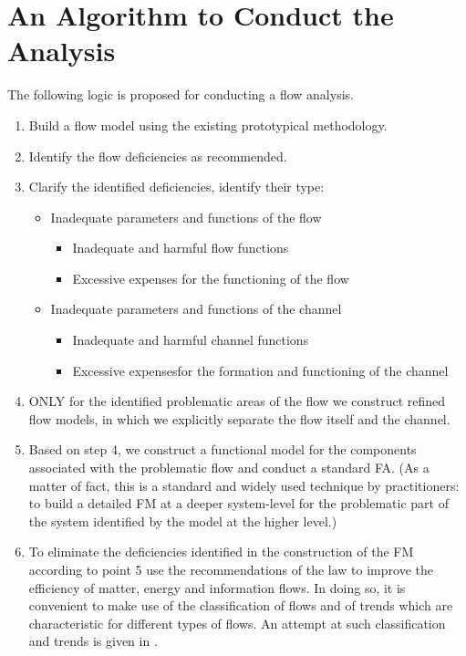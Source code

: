 \documentclass[a4paper,11pt]{article}
\begin{document}
\section*{An Algorithm to Conduct the Analysis}
The following logic is proposed for conducting a flow analysis.
\begin{enumerate}
\item Build a flow model using the existing prototypical methodology.
\item Identify the flow deficiencies as recommended.
\item Clarify the identified deficiencies, identify their type:
  \begin{itemize}
  \item Inadequate parameters and functions of the flow
    \begin{itemize}
    \item Inadequate and harmful flow functions
    \item Excessive expenses for the functioning of the flow
    \end{itemize}
  \item Inadequate parameters and functions of the channel
    \begin{itemize}
    \item Inadequate and harmful channel functions
    \item Excessive expensesfor the formation and functioning of the channel
    \end{itemize}
  \end{itemize}
\item ONLY for the identified problematic areas of the flow we construct
  refined flow models, in which we explicitly separate the flow itself and the
  channel.
\item Based on step 4, we construct a functional model for the components
  associated with the problematic flow and conduct a standard FA. (As a matter
  of fact, this is a standard and widely used technique by practitioners: to
  build a detailed FM at a deeper system-level for the problematic part of the
  system identified by the model at the higher level.)
\item To eliminate the deficiencies identified in the construction of the FM
  according to point 5 use the recommendations of the law to improve the
  efficiency of matter, energy and information flows. In doing so, it is
  convenient to make use of the classification of flows and of trends which
  are characteristic for different types of flows. An attempt at such
  classification and trends is given in \cite{8}.
\end{enumerate}
\end{document}

